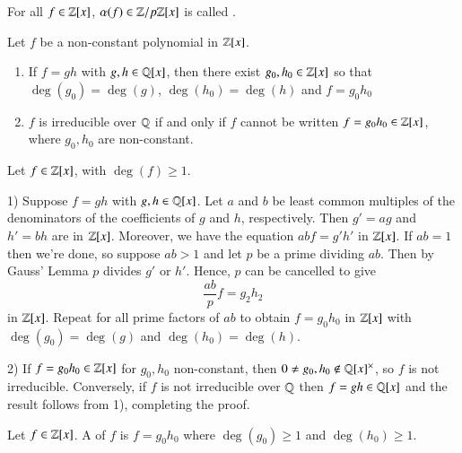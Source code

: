 \documentclass[12pt, a4paper, twoside, openright, titlepage]{book}
\begin{document}
\begin{defn}{}{}
    For all $f \in \mathbb Z[x]$, $\alpha(f) \in \mathbb Z/p\mathbb Z[x]$ is called .
\end{defn}

\begin{cor}{}{}
    Let $f$ be a non-constant polynomial in $\mathbb Z[x]$. \begin{enumerate}
        \item If $f =gh$ with $g,h \in \mathbb Q[x]$, then there exist $g_0,h_0 \in \mathbb Z[x]$ so that $\deg(g_0) = \deg(g)$, $\deg(h_0) = \deg(h)$ and $f = g_0h_0$
        \item $f$ is irreducible over $\mathbb Q$ if and only if $f$ cannot be written $f = g_0h_0 \in \mathbb Z[x]$, where $g_0,h_0$ are non-constant.
    \end{enumerate}
\end{cor}
\begin{proof*}{}{}
    Let $f \in \mathbb Z[x]$, with $\deg(f) \geq 1$. 
    
    1) Suppose $f = gh$ with $g,h \in \mathbb Q[x]$. Let $a$ and $b$ be least common multiples of the denominators of the coefficients of $g$ and $h$, respectively. Then $g' = ag$ and $h' = bh$ are in $\mathbb Z[x]$. Moreover, we have the equation $abf = g'h'$ in $\mathbb Z[x]$. If $ab = 1$ then we're done, so suppose $ab > 1$ and let $p$ be a prime dividing $ab$. Then by Gauss' Lemma $p$ divides $g'$ or $h'$. Hence, $p$ can be cancelled to give \begin{equation}
        \frac{ab}{p}f = g_2h_2
    \end{equation}
    in $\mathbb Z[x]$. Repeat for all prime factors of $ab$ to obtain $f = g_0h_0$ in $\mathbb Z[x]$ with $\deg(g_0) = \deg(g)$ and $\deg(h_0) = \deg(h)$.
    
    2) If $f = g_0h_0 \in \mathbb Z[x]$ for $g_0,h_0$ non-constant, then $0 \neq g_0,h_0 \notin \mathbb Q[x]^{\times}$, so $f$ is not irreducible. Conversely, if $f$ is not irreducible over $\mathbb Q$ then $f = gh \in \mathbb Q[x]$ and the result follows from 1), completing the proof.
\end{proof*}

\begin{defn}{}{}
    Let $f \in \mathbb Z[x]$. A  of $f$ is $f = g_0h_0$ where $\deg(g_0) \geq 1$ and $\deg(h_0) \geq 1$.
\end{defn}
\end{document}
